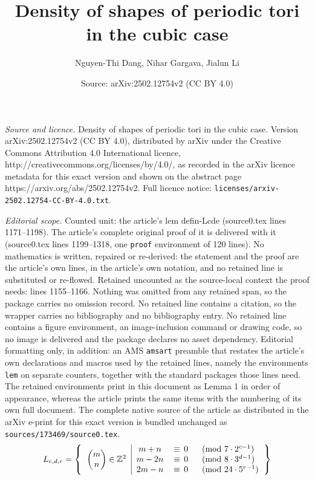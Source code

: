 \documentclass[10pt,a4paper]{amsart}
\title{Density of shapes of periodic tori in the cubic case}
\author{Nguyen-Thi Dang, Nihar Gargava, Jialun Li}
\date{Source: arXiv:2502.12754v2 (CC BY 4.0)}
\newcommand{\Z}{\bb Z}
\newcommand{\bb}[1]{\mathbb{#1}}
\begin{document}
\maketitle

\noindent\emph{Source and licence.} Density of shapes of periodic tori in the cubic case. Version arXiv:2502.12754v2 (CC BY 4.0), distributed by arXiv under the Creative Commons Attribution 4.0 International licence, http://creativecommons.org/licenses/by/4.0/, as recorded in the arXiv licence metadata for this exact version and shown on the abstract page https://arxiv.org/abs/2502.12754v2. Full licence notice: \texttt{licenses/arxiv-2502.12754-CC-BY-4.0.txt}.\par\smallskip

\noindent\textit{Editorial scope.} Counted unit: the article's lem defin-Lcde (source0.tex lines 1171--1198). The article's complete original proof of it is delivered with it (source0.tex lines 1199--1318, one \texttt{proof} environment of 120 lines). No mathematics is written, repaired or re-derived: the statement and the proof are the article's own lines, in the article's own notation, and no retained line is substituted or re-flowed.  Retained uncounted as the source-local context the proof needs: lines 1155--1166.  Nothing was omitted from any retained span, so the package carries no omission record.  No retained line contains a citation, so the wrapper carries no bibliography and no bibliography entry.  No retained line contains a figure environment, an image-inclusion command or drawing code, so no image is delivered and the package declares no asset dependency.  Editorial formatting only, in addition: an AMS \texttt{amsart} preamble that restates the article's own declarations and macros used by the retained lines, namely the environments \texttt{lem} on separate counters, together with the standard packages those lines need.  The retained environments print in this document as Lemma 1 in order of appearance, whereas the article prints the same items with the numbering of its own full document.  The complete native source of the article as distributed in the arXiv e-print for this exact version is bundled unchanged as \texttt{sources/173469/source0.tex}.
	\begin{equation}\label{eq:defi_of_L}
		L_{c,d,r}=
		\left\lbrace\begin{tabular}{c|ccl}
\multirow{3}*{$\begin{pmatrix}
    m \\
    n
\end{pmatrix} \in \Z^2$} 
& $m+n$  &$\equiv\,0$ &  $\pmod {7\cdot 2^{c-1}}$ \\ 
& $m-2n$ &$\equiv\,0$ &  $\pmod {8\cdot 3^{d-1}}$ \\ 
& $2m-n$ &$\equiv\,0$ &  $\pmod {24\cdot 5^{r-1}}$ 
		\end{tabular}\right\rbrace
	\end{equation}
\end{document}
